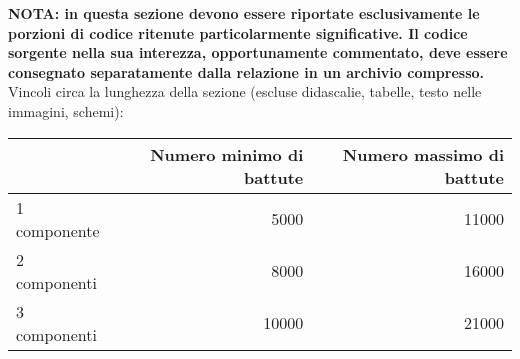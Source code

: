 \textbf{NOTA: in questa sezione devono essere riportate esclusivamente le porzioni di codice ritenute particolarmente significative. Il codice sorgente nella sua interezza, opportunamente commentato, deve essere consegnato separatamente dalla relazione in un archivio compresso.}\\


Vincoli circa la lunghezza della sezione (escluse didascalie, tabelle, testo nelle immagini, schemi):

\vspace{1cm}
\begin{tabular}{l|rr}
 & Numero minimo di battute & Numero massimo di battute \\
 \hline
 1 componente & 5000 & 11000 \\
 2 componenti & 8000 & 16000 \\
 3 componenti & 10000 & 21000 \\
 \hline
\end{tabular}


\newpage